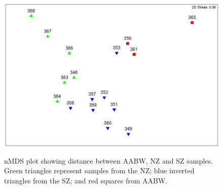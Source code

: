 \begin{figure}
  \centering
  \includegraphics[width=\textwidth]{../biogeog/deepnmds.png}
  \caption[\ac{nMDS} of \ac{AABW}, \ac{NZ} and \ac{SZ} samples]{\ac{nMDS} plot showing distance between \ac{AABW}, \ac{NZ} and \ac{SZ} samples.
  Green triangles represent samples from the \ac{NZ}; blue inverted triangles from the \ac{SZ}; and red squares from \ac{AABW}.}
  \label{fig:deepnmds}
\end{figure}
